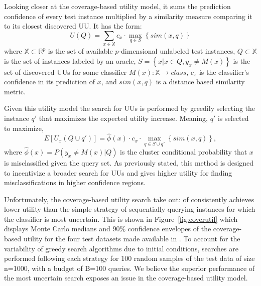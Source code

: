 \documentclass[letterpaper]{article} %
\newcommand{\wdb}[1]{{\color{blue} #1}} %
\begin{document}
\wdb{Looking closer at the coverage-based utility model}, it sums the prediction confidence of every test instance multiplied by a similarity measure comparing it to its closest discovered UU.  It has the form: $$U(Q) = \sum_{x \in \mathbb{X}} c_x \cdot \max_{q \in S} \left\{sim\left(x,q \right) \right\}$$ where $\mathbb{X} \subset \mathbb{R}^p$ is the set of available $p$-dimensional unlabeled test instances, $Q \subset \mathbb{X}$ is the set of instances labeled by an oracle, $S = \left\{x|x \in Q, y_x \neq M(x)\right\}$ is the set of discovered UUs for some classifier $M(x):\mathbb{X} \rightarrow class$, $c_x$ is the classifier's confidence in its prediction of $x$, and $sim(x,q)$ is a distance based similarity metric. 

Given this utility model the search for UUs is performed by greedily selecting the instance $q'$ that maximizes the expected utility increase.  Meaning, $q'$ is selected to maximize, $$E\left[U_x\left(Q \cup q'\right)\right] = \hat{\phi}(x) \cdot c_x \cdot \max_{q \in S \cup q'} \left\{sim\left(x,q \right) \right\},$$ where $\hat{\phi}(x) = P\left(y_x \neq M(x) |Q \right)$ is the \wdb{cluster} conditional probability that $x$ is misclassified given the query set.  As previously stated, this method is designed to incentivize a broader search for UUs and gives higher utility for finding misclassifications in higher confidence regions.  

Unfortunately, the coverage-based utility search  \wdb{take out: of \citet{Bansal2018}} consistently achieves lower utility than the simple strategy of sequentially querying instances for which the classifier is most uncertain.  This is shown in Figure~\ref{fig:coverutil} which displays Monte Carlo medians and 90\% confidence envelopes of the coverage-based utility for the four test datasets made available in \citet{Bansal2018}.  To account for the variability of greedy search algorithms due to initial conditions, searches are performed following each strategy for 100 random samples of the test data of size n=1000, with a budget of B=100 queries.  We believe the superior performance of the most uncertain search exposes an issue in the coverage-based utility model.  
\end{document}
